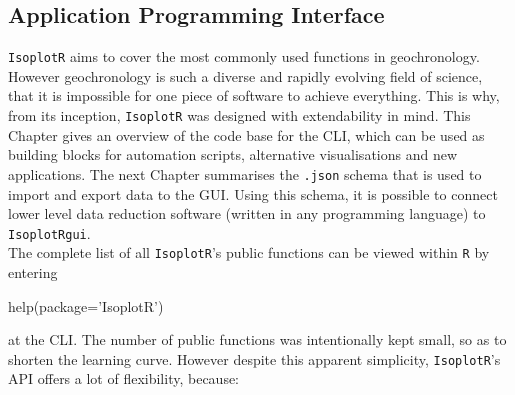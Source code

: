 \begin{refsection}

\chapter{Application Programming Interface}\label{ch:API}
  
\texttt{IsoplotR} aims to cover the most commonly used functions in
geochronology. However geochronology is such a diverse and rapidly
evolving field of science, that it is impossible for one piece of
software to achieve everything. This is why, from its inception,
\texttt{IsoplotR} was designed with extendability in mind. This
Chapter gives an overview of the code base for the CLI, which can be
used as building blocks for automation scripts, alternative
visualisations and new applications. The next Chapter summarises the
\texttt{.json} schema that is used to import and export data to the
GUI. Using this schema, it is possible to connect lower level data
reduction software (written in any programming language) to
\texttt{IsoplotRgui}.\\

The complete list of all \texttt{IsoplotR}'s public functions can be
viewed within \texttt{R} by entering

\begin{console}
help(package='IsoplotR')
\end{console}

\noindent at the CLI. The number of public functions was intentionally
kept small, so as to shorten the learning curve. However despite this
apparent simplicity, \texttt{IsoplotR}'s API offers a lot of
flexibility, because:


\end{refsection}
